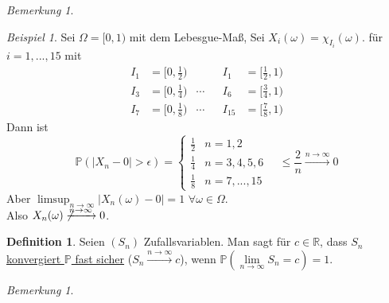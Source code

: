 \documentclass[10pt,a4paper]{article}
\newcommand{\R}{\ensuremath{\mathbb{R}}}
\newcommand{\Prb}{\mathbb P}
\theoremstyle{plain}
\theoremstyle{definition}
\newtheorem{definition}[theorem]{Definition}
\theoremstyle{remark}
\newtheorem{bem}[theorem]{Bemerkung}
\newtheorem{exm}[theorem]{Beispiel}
\begin{document}
	\begin{bem}
	\end{bem}

	\begin{exm}
		Sei $\Omega=[0,1)$ mit dem Lebesgue-Maß, Sei $X_i(\omega)=\chi_{I_i}(\omega)$. für $i=1,...,15$ mit
		\begin{align*}
		I_1&=\big[0,\frac{1}{2}\big)&&&I_1&=\big[\frac{1}{2},1\big)\\
		I_3&=\big[0,\frac{1}{4}\big)&\cdots&&I_6&=\big[\frac{3}{4},1\big)\\
		I_7&=\big[0,\frac{1}{8}\big)&\cdots&&I_{15}&=\big[\frac{7}{8},1\big)
		\end{align*}
		Dann ist 
		\[\Prb(|X_n-0|>\epsilon)=\begin{cases}
		\frac{1}{2}&n=1,2\\
		\frac{1}{4}&n=3,4,5,6\\
		\frac{1}{8}&n=7,...,15
		\end{cases}\quad\leq\frac{2}{n}\xrightarrow{n\to\infty}0\]
		Aber $\limsup_{n\to\infty}|X_n(\omega)-0|=1$ $\forall\omega\in\Omega$.\\
		Also $X_n(\omega)\not\xrightarrow{n\to\infty}0$.
	\end{exm}

	\begin{definition}
		Seien $(S_n)$ Zufallsvariablen. Man sagt für $c\in\R$, dass $S_n$ \underline{konvergiert $\Prb$ fast sicher} ($S_n\xrightarrow{n\to\infty}c$), wenn $\Prb\left(\lim\limits_{n\to\infty} S_n=c\right)=1$.
	\end{definition}
	
	\begin{bem}
	\end{bem}
	
\end{document}
